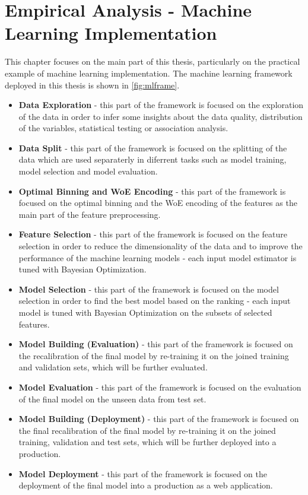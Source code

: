 \chapter{Empirical Analysis - Machine Learning Implementation}
\label{chap:four}
This chapter focuses on the main part of this thesis, particularly on the practical example of machine learning implementation. The machine learning framework deployed in this thesis is shown in \autoref{fig:mlframe}.
\begin{itemize}\setlength\itemsep{0em}
\item \textbf{Data Exploration} - this part of the framework is focused on the exploration of the data in order to infer some insights about the data quality, distribution of the variables, statistical testing or association analysis.
\item \textbf{Data Split} - this part of the framework is focused on the splitting of the data which are used separaterly in diferrent tasks such as model training, model selection and model evaluation.
\item \textbf{Optimal Binning and WoE Encoding} - this part of the framework is focused on the optimal binning and the WoE encoding of the features as the main part of the feature preprocessing.
\item \textbf{Feature Selection} - this part of the framework is focused on the feature selection in order to reduce the dimensionality of the data and to improve the performance of the machine learning models - each input model estimator is tuned with Bayesian Optimization.
\item \textbf{Model Selection} - this part of the framework is focused on the model selection in order to find the best model based on the ranking - each input model is tuned with Bayesian Optimization on the subsets of selected features.
\item \textbf{Model Building (Evaluation)} - this part of the framework is focused on the recalibration of the final model by re-training it on the joined training and validation sets, which will be further evaluated.
\item \textbf{Model Evaluation} - this part of the framework is focused on the evaluation of the final model on the unseen data from test set.
\item \textbf{Model Building (Deployment)} - this part of the framework is focused on the final recalibration of the final model by re-training it on the joined training, validation and test sets, which will be further deployed into a production.
\item \textbf{Model Deployment} - this part of the framework is focused on the deployment of the final model into a production as a web application.
\end{itemize}

